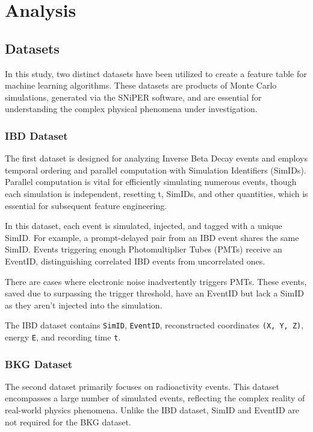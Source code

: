 \chapter{Analysis}

\section{Datasets}
In this study, two distinct datasets have been utilized to create a feature table for machine learning algorithms. These datasets are products of Monte Carlo simulations, generated via the SNiPER software, and are essential for understanding the complex physical phenomena under investigation.

\subsection*{IBD Dataset}
The first dataset is designed for analyzing Inverse Beta Decay events and employs temporal ordering and parallel computation with Simulation Identifiers (SimIDs). Parallel computation is vital for efficiently simulating numerous events, though each simulation is independent, resetting t, SimIDs, and other quantities, which is essential for subsequent feature engineering.

In this dataset, each event is simulated, injected, and tagged with a unique SimID. For example, a prompt-delayed pair from an IBD event shares the same SimID. Events triggering enough Photomultiplier Tubes (PMTs) receive an EventID, distinguishing correlated IBD events from uncorrelated ones.

There are cases where electronic noise inadvertently triggers PMTs. These events, saved due to surpassing the trigger threshold, have an EventID but lack a SimID as they aren't injected into the simulation.

The IBD dataset contains \texttt{SimID}, \texttt{EventID}, reconstructed coordinates \texttt{(X, Y, Z)}, energy \texttt{E}, and recording time \texttt{t}.

\subsection*{BKG Dataset}

The second dataset primarily focuses on radioactivity events. This dataset encompasses a large number of simulated events, reflecting the complex reality of real-world physics phenomena. Unlike the IBD dataset, SimID and EventID are not required for the BKG dataset.

